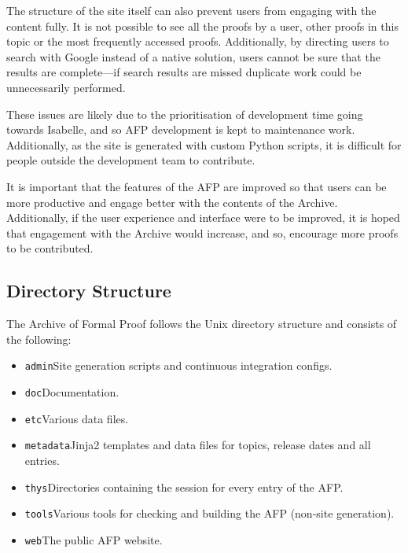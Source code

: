 \documentclass[bsc,frontabs,oneside,singlespacing,parskip,deptreport,logo]{infthesis}
\begin{document}
The structure of the site itself can also prevent users from engaging with the content fully. It is not possible to see all the proofs by a user, other proofs in this topic or the most frequently accessed proofs. Additionally, by directing users to search with Google instead of a native solution, users cannot be sure that the results are complete---if search results are missed duplicate work could be unnecessarily performed.

These issues are likely due to the prioritisation of development time going towards Isabelle, and so AFP development is kept to maintenance work. Additionally, as the site is generated with custom Python scripts, it is difficult for people outside the development team to contribute.

It is important that the features of the AFP are improved so that users can be more productive and engage better with the contents of the Archive. Additionally, if the user experience and interface  were to be improved, it is hoped that engagement with the Archive would increase, and so, encourage more proofs to be contributed.

\cbend
\subsection{Directory Structure} \label{directory-structure}

The Archive of Formal Proof follows the Unix directory structure and consists of the following:

\begin{itemize}
  \item \texttt{admin}\quad Site generation scripts and continuous integration configs.
  \item \texttt{doc}\quad Documentation.
  \item \texttt{etc}\quad Various data files.
  \item \texttt{metadata}\quad Jinja2 templates and data files for topics, release dates and all entries.
  \item \texttt{thys}\quad Directories containing the session for every entry of the AFP.
  \item \texttt{tools}\quad Various tools for checking and building the AFP (non-site generation).
  \item \texttt{web}\quad The public AFP website.
\end{itemize}
\end{document}
